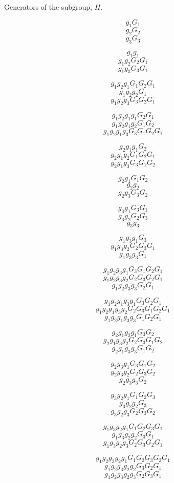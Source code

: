 \addtolength{\topmargin}{-1in}
\addtolength{\textheight}{1.0in}
\addtolength{\textwidth}{1in}
\addtolength{\oddsidemargin}{-5in}
\addtolength{\evensidemargin}{-5in}


Generators of the subgroup, $H$.

$$g_{1}   G_{1}$$
$$g_{2}   G_{2}$$
$$g_{3}   G_{3}$$


$$g_{1}    g_{1}   $$
$$g_{1}    g_{2}   G_{2}G_{1}$$
$$g_{1}    g_{3}   G_{3}G_{1}$$


$$g_{1}g_{2}    g_{1}   G_{1}G_{2}G_{1}$$
$$g_{1}g_{2}    g_{2}   G_{1}$$
$$g_{1}g_{2}    g_{3}   G_{3}G_{2}G_{1}$$


$$g_{1}g_{2}g_{1}    g_{1}   G_{2}G_{1}$$
$$g_{1}g_{2}g_{1}    g_{2}   G_{1}G_{2}$$
$$g_{1}g_{2}g_{1}    g_{3}   G_{3}G_{1}G_{2}G_{1}$$


$$g_{2}g_{1}    g_{1}   G_{2}$$
$$g_{2}g_{1}    g_{2}   G_{1}G_{2}G_{1}$$
$$g_{2}g_{1}    g_{3}   G_{3}G_{1}G_{2}$$


$$g_{2}    g_{1}   G_{1}G_{2}$$
$$g_{2}    g_{2}   $$
$$g_{2}    g_{3}   G_{3}G_{2}$$


$$g_{3}    g_{1}   G_{3}G_{1}$$
$$g_{3}    g_{2}   G_{2}G_{3}$$
$$g_{3}    g_{3}   $$


$$g_{1}g_{3}    g_{1}   G_{3}$$
$$g_{1}g_{3}    g_{2}   G_{2}G_{3}G_{1}$$
$$g_{1}g_{3}    g_{3}   G_{1}$$


$$g_{1}g_{2}g_{3}    g_{1}   G_{3}G_{1}G_{2}G_{1}$$
$$g_{1}g_{2}g_{3}    g_{2}   G_{2}G_{3}G_{2}G_{1}$$
$$g_{1}g_{2}g_{3}    g_{3}   G_{2}G_{1}$$


$$g_{1}g_{2}g_{1}g_{3}    g_{1}   G_{3}G_{2}G_{1}$$
$$g_{1}g_{2}g_{1}g_{3}    g_{2}   G_{2}G_{3}G_{1}G_{2}G_{1}$$
$$g_{1}g_{2}g_{1}g_{3}    g_{3}   G_{1}G_{2}G_{1}$$


$$g_{2}g_{1}g_{3}    g_{1}   G_{3}G_{2}$$
$$g_{2}g_{1}g_{3}    g_{2}   G_{2}G_{3}G_{1}G_{2}$$
$$g_{2}g_{1}g_{3}    g_{3}   G_{1}G_{2}$$


$$g_{2}g_{3}    g_{1}   G_{3}G_{1}G_{2}$$
$$g_{2}g_{3}    g_{2}   G_{2}G_{3}G_{2}$$
$$g_{2}g_{3}    g_{3}   G_{2}$$


$$g_{3}g_{2}    g_{1}   G_{1}G_{2}G_{3}$$
$$g_{3}g_{2}    g_{2}   G_{3}$$
$$g_{3}g_{2}    g_{3}   G_{2}G_{3}G_{2}$$


$$g_{1}g_{3}g_{2}    g_{1}   G_{1}G_{2}G_{3}G_{1}$$
$$g_{1}g_{3}g_{2}    g_{2}   G_{3}G_{1}$$
$$g_{1}g_{3}g_{2}    g_{3}   G_{2}G_{3}G_{2}G_{1}$$


$$g_{1}g_{2}g_{3}g_{2}    g_{1}   G_{1}G_{2}G_{3}G_{2}G_{1}$$
$$g_{1}g_{2}g_{3}g_{2}    g_{2}   G_{3}G_{2}G_{1}$$
$$g_{1}g_{2}g_{3}g_{2}    g_{3}   G_{2}G_{3}G_{1}$$


